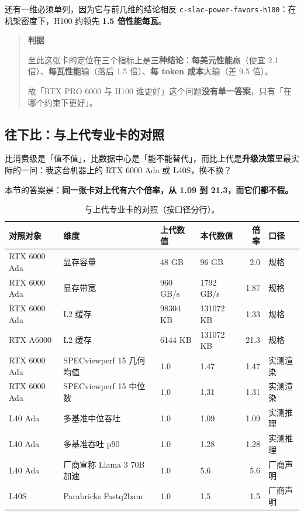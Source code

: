 还有一维必须单列，因为它与前几维的结论相反 {\scriptsize\texttt{c-\hspace{0pt}slac-\hspace{0pt}power-\hspace{0pt}favors-\hspace{0pt}h100}}：在机架密度下，H100 约领先 \textbf{1.5 倍性能每瓦}。


\begin{quote}\small
\textbf{ 判据}

至此这张卡的定位在三个指标上是\textbf{三种结论}：\textbf{每美元性能}赢（便宜 2.1 倍）、\textbf{每瓦性能}输（落后 1.5 倍）、\textbf{每 token 成本}大输（差 9.5 倍）。

故「RTX PRO 6000 与 H100 谁更好」这个问题\textbf{没有单一答案}，只有「在哪个约束下更好」。

\end{quote}


\subsection{往下比：与上代专业卡的对照}

比消费级是「值不值」，比数据中心是「能不能替代」，而比上代是\textbf{升级决策}里最实际的一问：我这台机器上的 RTX 6000 Ada 或 L40S，换不换？


本节的答案是：\textbf{同一张卡对上代有六个倍率，从 1.09 到 21.3，而它们都不假。}


\begin{table}[t]
\centering
\footnotesize
\setlength{\tabcolsep}{4pt}
\caption{与上代专业卡的对照（按口径分行）。}
\label{tab:8}
\begin{tabular}{llllrl}
\toprule
对照对象 & 维度 & 上代数值 & 本代数值 & 倍率 & 口径 \\
\midrule
RTX 6000 Ada & 显存容量 & 48 GB & 96 GB & 2.0 & 规格 \\
RTX 6000 Ada & 显存带宽 & 960 GB/s & 1792 GB/s & 1.87 & 规格 \\
RTX 6000 Ada & L2 缓存 & 98304 KB & 131072 KB & 1.33 & 规格 \\
RTX A6000 & L2 缓存 & 6144 KB & 131072 KB & 21.3 & 规格 \\
RTX 6000 Ada & SPECviewperf 15 几何均值 & 1.0 & 1.47 & 1.47 & 实测渲染 \\
RTX 6000 Ada & SPECviewperf 15 中位数 & 1.0 & 1.31 & 1.31 & 实测渲染 \\
L40 Ada & 多基准中位吞吐 & 1.0 & 1.09 & 1.09 & 实测推理 \\
L40 Ada & 多基准吞吐 p90 & 1.0 & 1.28 & 1.28 & 实测推理 \\
L40 Ada & 厂商宣称 Llama 3 70B 加速 & 1.0 & 5.6 & 5.6 & 厂商声明 \\
L40S & Parabricks Fastq2bam & 1.0 & 1.5 & 1.5 & 厂商声明 \\
\bottomrule
\end{tabular}
\end{table}

